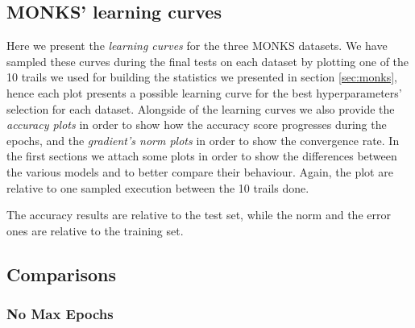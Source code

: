 \begin{appendices}
    \chapter{MONKS' learning curves} %
    \label{cha:monks_learning_curves}
        Here we present the \textit{learning curves} for the three MONKS datasets. We have sampled these curves
        during the final tests on each dataset by plotting one of the 10 trails we used for building the
        statistics we presented in section \ref{sec:monks}, hence each plot presents a possible learning curve
        for the best hyperparameters' selection for each dataset. Alongside of the learning curves
        we also provide the \textit{accuracy plots} in order to show how the accuracy score progresses
        during the epochs, and the \textit{gradient's norm plots} in order to show the convergence
        rate. In the first sections we attach some plots in order to show
        the differences between the various models and to better compare their behaviour. Again, the plot are
        relative to one sampled execution between the 10 trails done.

        The accuracy results are relative to the test set, while the norm and the error ones are relative to the training set.

        \clearpage

        \section{Comparisons} %
        \label{sec:Comparisons}

            \subsection{No Max Epochs}


\end{appendices}
